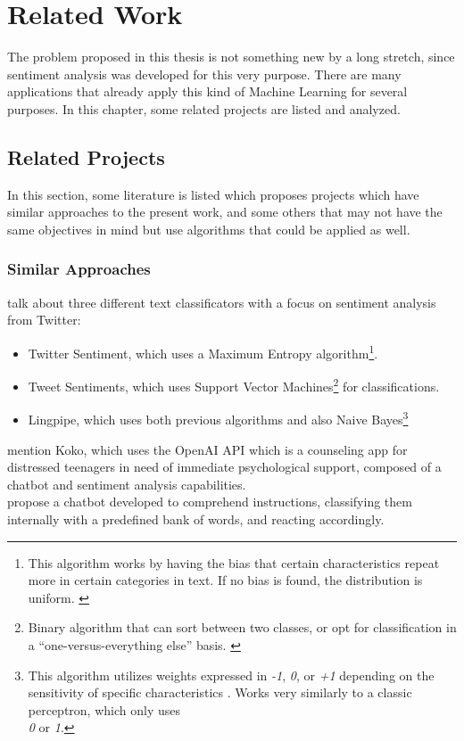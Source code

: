 \chapter{Related Work}
The problem proposed in this thesis is not something new by a long stretch, since sentiment analysis was developed for this very purpose. There are many applications that already apply this kind of Machine Learning for several purposes. In this chapter, some related projects are listed and analyzed.

\section{Related Projects}
In this section, some literature is listed which proposes projects which have similar approaches to the present work, and some others that may not have the same objectives in mind but use algorithms that could be applied as well.
\subsection{Similar Approaches}
\citet{rf10} talk about three different text classificators with a focus on sentiment analysis from Twitter:\\ 
\begin{itemize}
\item Twitter Sentiment, which uses a Maximum Entropy algorithm\footnote{This algorithm works by having the bias that certain characteristics repeat more in certain categories in text. If no bias is found, the distribution is uniform. \citep{rf17}}.
\item Tweet Sentiments, which uses Support Vector Machines\footnote{Binary algorithm that can sort between two classes, or opt for classification in a ``one-versus-everything else'' basis. \citep{rf18}} for classifications.
\item Lingpipe, which uses both previous algorithms and also Naive Bayes\footnote{This algorithm utilizes weights expressed in \textit{-1}, \textit{0}, or \textit{+1} depending on the sensitivity of specific characteristics \citep{rf19}. Works very similarly to a classic perceptron, which only uses\\ \textit{0} or \textit{1}.}
\end{itemize}
\citet{rf6} mention Koko, which uses the OpenAI API which is a counseling app for distressed teenagers in need of immediate psychological support, composed of a chatbot and sentiment analysis capabilities.\\
\citet{rf14} propose a chatbot developed to comprehend instructions, classifying them internally with a predefined bank of words, and reacting accordingly.

